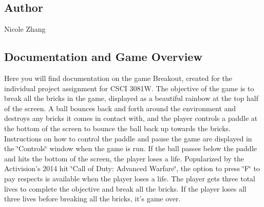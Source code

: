 \subsection*{Author}

Nicole Zhang

\subsection*{Documentation and Game Overview}

Here you will find documentation on the game Breakout, created for the individual project assignment for C\-S\-C\-I 3081\-W. The objective of the game is to break all the bricks in the game, displayed as a beautiful rainbow at the top half of the screen. A ball bounces back and forth around the environment and destroys any bricks it comes in contact with, and the player controls a paddle at the bottom of the screen to bounce the ball back up towards the bricks. Instructions on how to control the paddle and pause the game are displayed in the \char`\"{}\-Controls\char`\"{} window when the game is run. If the ball passes below the paddle and hits the bottom of the screen, the player loses a life. Popularized by the Activision's 2014 hit \char`\"{}\-Call of Duty\-: Advanced Warfare\char`\"{}, the option to press \char`\"{}\-F\char`\"{} to pay respects is available when the player loses a life. The player gets three total lives to complete the objective and break all the bricks. If the player loses all three lives before breaking all the bricks, it's game over. 


